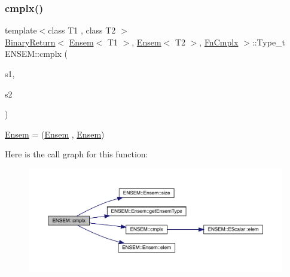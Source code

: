 \subsubsection{\texorpdfstring{cmplx()}{cmplx()}\hspace{0.1cm}{\footnotesize\ttfamily [1/3]}}
{\footnotesize\ttfamily template$<$class T1 , class T2 $>$ \\
\mbox{\hyperlink{structENSEM_1_1BinaryReturn}{Binary\+Return}}$<$ \mbox{\hyperlink{classENSEM_1_1Ensem}{Ensem}}$<$ T1 $>$, \mbox{\hyperlink{classENSEM_1_1Ensem}{Ensem}}$<$ T2 $>$, \mbox{\hyperlink{structENSEM_1_1FnCmplx}{Fn\+Cmplx}} $>$\+::Type\+\_\+t E\+N\+S\+E\+M\+::cmplx (\begin{DoxyParamCaption}\item[{const \mbox{\hyperlink{classENSEM_1_1Ensem}{Ensem}}$<$ T1 $>$ \&}]{s1,  }\item[{const \mbox{\hyperlink{classENSEM_1_1Ensem}{Ensem}}$<$ T2 $>$ \&}]{s2 }\end{DoxyParamCaption})\hspace{0.3cm}{\ttfamily [inline]}}



\mbox{\hyperlink{classENSEM_1_1Ensem}{Ensem}} = (\mbox{\hyperlink{classENSEM_1_1Ensem}{Ensem}} , \mbox{\hyperlink{classENSEM_1_1Ensem}{Ensem}}) 

Here is the call graph for this function\+:\nopagebreak
\begin{figure}[H]
\begin{center}
\leavevmode
\includegraphics[width=350pt]{d1/d9e/group__eensem_gaed2aa58870f554b9ad30212f8d25ca46_cgraph}
\end{center}
\end{figure}
\mbox{\label{group__eensem_gadd471503e7ac8d60fb8a955e1999f6fa}} 
